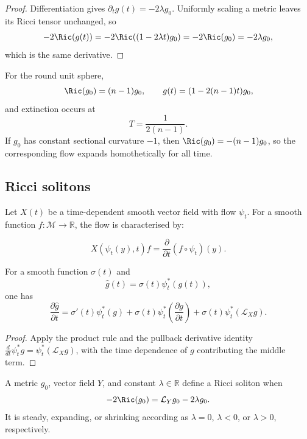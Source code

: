 \begin{proof}
\sketch Differentiation gives $\partial_tg(t)=-2\lambda g_0$. Uniformly
scaling a metric leaves its Ricci tensor unchanged, so
\[
-2\Ric(g(t))=-2\Ric((1-2\lambda t)g_0)=-2\Ric(g_0)=-2\lambda g_0,
\]
which is the same derivative.
\end{proof}

For the round unit sphere,
\[
\Ric(g_0)=(n-1)g_0,
\qquad
g(t)=(1-2(n-1)t)g_0,
\]
and extinction occurs at
\[
T=\frac{1}{2(n-1)}.
\]
If $g_0$ has constant sectional curvature $-1$, then
$\Ric(g_0)=-(n-1)g_0$, so the corresponding flow expands homothetically for
all time.

\subsection{Ricci solitons}

Let $X(t)$ be a time-dependent smooth vector field with flow $\psi_t$. For a
smooth function $f:\mathcal M\to\mathbb R$, the flow is characterised by:

\begin{definition}
\label{topping-intro-flow-field}
\[
X(\psi_t(y),t)f=\frac{\partial}{\partial t}(f\circ\psi_t)(y).
\]
\end{definition}

\begin{proposition}
\label{topping-intro-pushforward-evolution}
For a smooth function $\sigma(t)$ and
\[
\hat g(t)=\sigma(t)\psi_t^*(g(t)),
\]
one has
\[
\frac{\partial \hat g}{\partial t}
=\sigma'(t)\psi_t^*(g)
+\sigma(t)\psi_t^*\!\left(\frac{\partial g}{\partial t}\right)
+\sigma(t)\psi_t^*(\mathcal L_Xg).
\]
\end{proposition}

\begin{proof}
\sketch Apply the product rule and the pullback derivative identity
$\frac{d}{dt}\psi_t^*g=\psi_t^*(\mathcal L_Xg)$, with the time dependence of
$g$ contributing the middle term.
\end{proof}

\begin{definition}
\label{topping-intro-ricci-soliton}
A metric $g_0$, vector field $Y$, and constant $\lambda\in\mathbb R$ define
a Ricci soliton when
\[
-2\Ric(g_0)=\mathcal L_Yg_0-2\lambda g_0.
\]
It is steady, expanding, or shrinking according as $\lambda=0$, $\lambda<0$,
or $\lambda>0$, respectively.
\end{definition}

